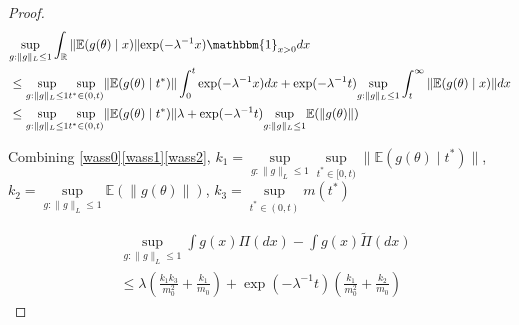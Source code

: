 \documentclass[10pt]{article}
\DeclareMathOperator{\1}{\mathbbm{1}}
\begin{document}
\begin{proof}[Proof]
\begin{equation}
\label{wass2}
\begin{aligned}
& \underset{g:\|g\|_L\le 1}\sup\int_\mathbb{R}  \|\mathbb{E}(g(\theta) \mid x)\| { \exp(- \lambda^{-1} x)}	\mathbbm{1}_{x > 0} d x \\
&\le \underset{g:\|g\|_L\le 1}\sup\underset{t^*\in (0,t)}\sup \|\mathbb{E}(g(\theta) \mid t^*)\|	
\int_0^{t} \exp(- \lambda^{-1} x ) dx + \exp(- \lambda^{-1} t ) \underset{g:\|g\|_L\le 1}\sup \int_t^{\infty}   \|\mathbb{E}( g(\theta )\mid x)\| dx \\
&\le \underset{g:\|g\|_L\le 1}\sup\underset{t^*\in (0,t)}\sup \|\mathbb{E}(g(\theta) \mid t^*)\|	\lambda + \exp(- \lambda^{-1} t ) \underset{g:\|g\|_L\le 1} \sup \mathbb{E}(\| g(\theta )\|) \\
\end{aligned}
\end{equation}

Combining \eqref{wass0}\eqref{wass1}\eqref{wass2}, $k_1=\underset{g:\|g\|_L\le 1}\sup\underset{t^*\in [0,t)}\sup \|\mathbb{E}(g(\theta) \mid t^*)\|$, $k_2=\underset{g:\|g\|_L\le 1} \sup \mathbb{E}(\| g(\theta )\|)$, $k_3= \underset{t^*\in (0,t)}\sup  m(t^{*})$


\begin{equation}
\begin{aligned}
& \underset{g:\|g\|_L\le 1}\sup \int g(x) \Pi(dx) -  \int g(x) \tilde\Pi(dx) \\
	& \le \lambda (\frac{k_1 k_3}{m_0^2} + \frac{k_1}{m_0}) + \exp(- \lambda^{-1} t )(\frac{k_1}{m_0^2} + \frac{k_2}{m_0})
	\end{aligned}
	\end{equation}


	\end{proof}
	
\end{document}
